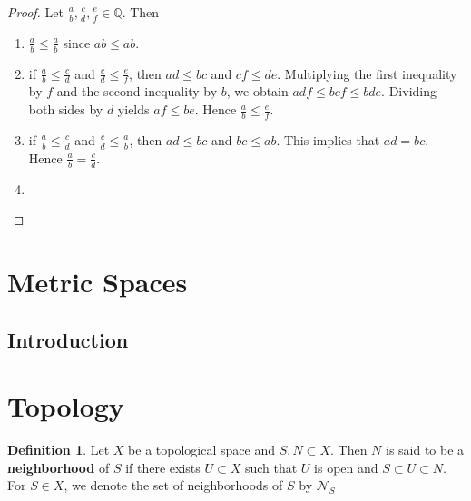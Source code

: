 \documentclass[12pt]{amsart}
\theoremstyle{definition}
\newtheorem{defn}[definition]{Definition}
\theoremstyle{remark}
\theoremstyle{definition}
\newcommand{\Q}{\mathbb{Q}}
\newcommand{\MN}{\mathcal{N}}
\begin{document}
	\begin{proof} Let $\frac{a}{b}, \frac{c}{d}, \frac{e}{f} \in \Q$. Then
		\begin{enumerate}
			\item  $\frac{a}{b} \leq \frac{a}{b}$ since $ab \leq ab$. 
			\item if $\frac{a}{b} \leq \frac{c}{d}$ and $\frac{c}{d} \leq  \frac{e}{f}$, then $ad \leq bc$ and $ cf \leq de$. Multiplying the first inequality by $f$ and the second inequality by $b$, we obtain $adf \leq bcf \leq bde$. Dividing both sides by $d$ yields $af \leq be$. Hence $\frac{a}{b} \leq \frac{e}{f}$. 
			\item if $\frac{a}{b} \leq \frac{c}{d}$ and $\frac{c}{d} \leq \frac{a}{b}$, then $ad \leq bc$ and $bc \leq ab$. This implies that $ad = bc$. Hence $\frac{a}{b} = \frac{c}{d}$.
			\item 
		\end{enumerate}
	\end{proof}
	
	\section{Metric Spaces}
	
	\subsection{Introduction}
	
	\newpage
	
	
	
	
	
	
	
	
	
	
	
	
	
	
	
	
	
	
	
	
	
	
	
	
	
	
	
	
	
	\section{Topology}
	
	\begin{defn}
	Let $X$ be a topological space and $S,N \subset X$. Then $N$ is said to be a \textbf{neighborhood} of $S$ if there exists $U \subset X$ such that $U$ is open and $S \subset U \subset N$. For $S \in X$, we denote the set of neighborhoods of $S$ by $\MN_S$ 
	\end{defn}
	
\end{document}
